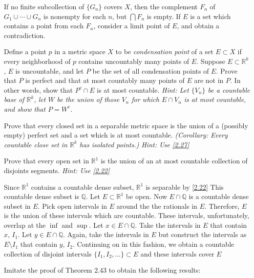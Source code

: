 \begin{exercise}
  If no finite subcollection of \(\{G_n\}\) covers \(X\), then the complement
  \(F_n\) of \(G_1\cup\cdots\cup G_n\) is nonempty for each \(n\), but
  \(\bigcap F_n\) is empty.
  If \(E\) is a set which contains a point from each \(F_n\), consider a limit
  point of \(E\), and obtain a contradiction.
\item
  \label{2.27}
  Define a point \(p\) in a metric space \(X\) to be
  \textit{condensation point} of a set \(E\subset X\) if every neighborhood of
  \(p\) contains uncountably many points of \(E\).
  Suppose \(E\subset\mathbb{R}^k\), \(E\) is uncountable, and let \(P\) be the
  set of all condensation points of \(E\).
  Prove that \(P\) is perfect and that at most countably many points of \(E\)
  are not in \(P\).
  In other words, show that \(P^c\cap E\) is at most countable.
  \textit{Hint: Let \(\{V_n\}\) be a countable base of \(\mathbb{R}^k\), let
    \(W\) be the union of those \(V_n\) for which \(E\cap V_n\) is at most
    countable, and show that \(P = W^c\).}
\item
  Prove that every closed set in a separable metric space is the union of a
  (possibly empty) perfect set and a set which is at most countable.
  \textit{(Corollary: Every countable close set in \(\mathbb{R}^k\) has
    isolated points.)
    Hint: Use \cref{2.27}}
\item
  \label{2.29}
  Prove that every open set in \(\mathbb{R}^1\) is the union of an at most
  countable collection of disjoints segments.
  \textit{Hint: Use \cref{2.22}}
  \par\smallskip
  Since \(\mathbb{R}^1\) contains a countable dense subset, \(\mathbb{R}^1\) is
  separable by \cref{2.22}
  This countable dense subset is \(\mathbb{Q}\).
  Let \(E\subset\mathbb{R}^1\) be open.
  Now \(E\cap\mathbb{Q}\) is a countable dense subset in \(E\).
  Pick open intervals in \(E\) around the the rationals in \(E\).
  Therefore, \(E\) is the union of these intervals which are countable.
  These intervals, unfortunately, overlap at the \(\inf\) and \(\sup\).
  Let \(x\in E\cap\mathbb{Q}\).
  Take the intervals in \(E\) that contain \(x\), \(I_1\).
  Let \(y\in E\cap\mathbb{Q}\).
  Again, take the intervals in \(E\) but construct the intervals as
  \(E\setminus I_1\) that contain \(y\), \(I_2\).
  Continuing on in this fashion, we obtain a countable collection of disjoint
  intervals \(\{I_1,I_2,\ldots\}\subset E\) and these intervals cover \(E\)
\item
  Imitate the proof of Theorem \(2.43\) to obtain the following results:
  \par\smallskip

\end{exercise}
